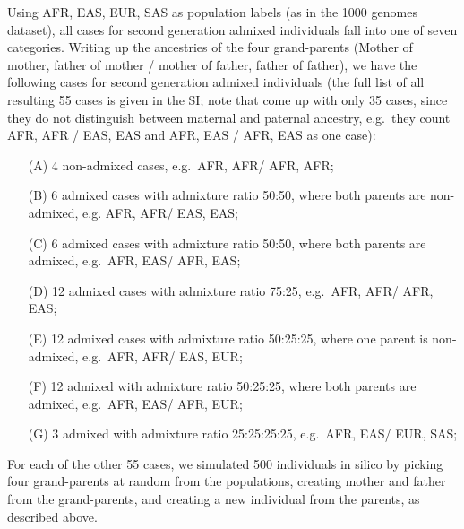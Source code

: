 \documentclass[12pt]{article}
\theoremstyle{definition}
\begin{document}
Using AFR, EAS, EUR, SAS as population labels (as in the 1000 genomes
dataset), all cases for second generation admixed individuals fall
into one of seven categories. Writing up the ancestries of the four
grand-parents (Mother of mother, father of mother / mother of father,
father of father), we have the following cases for second generation
admixed individuals (the full list of all resulting 55 cases is given
in the SI; note that \cite{Cheung2018} come up with only 35 cases,
since they do not distinguish between maternal and paternal ancestry,
e.g.\ they count AFR, AFR / EAS, EAS and AFR, EAS / AFR, EAS as one
case):

\begin{itemize}
\item[(A)] 4 non-admixed cases, e.g.\ AFR, AFR/ AFR, AFR;
\item[(B)] 6 admixed cases with admixture ratio 50:50, where both
  parents are non-admixed, e.g. AFR, AFR/ EAS, EAS;
\item[(C)] 6 admixed cases with admixture ratio 50:50, where both
  parents are admixed, e.g.\ AFR, EAS/ AFR, EAS;
\item[(D)] 12 admixed cases with admixture ratio 75:25, e.g.\ AFR,
  AFR/ AFR, EAS;
\item[(E)] 12 admixed cases with admixture ratio 50:25:25, where one
  parent is non-admixed, e.g.\ AFR, AFR/ EAS, EUR;
\item[(F)] 12 admixed with admixture ratio 50:25:25, where both
  parents are admixed, e.g.\ AFR, EAS/ AFR, EUR;
\item[(G)] 3 admixed with admixture ratio 25:25:25:25, e.g.\ AFR, EAS/
  EUR, SAS;
\end{itemize}
For each of the other 55 cases, we simulated 500 individuals in silico
by picking four grand-parents at random from the populations, creating
mother and father from the grand-parents, and creating a new
individual from the parents, as described above.
\end{document}
